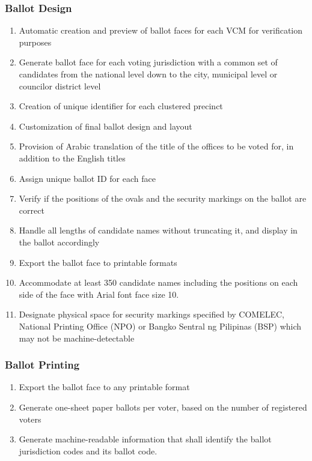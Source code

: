 \documentclass[a4paper, 11pt]{article}
\begin{document}
\subsubsection{Ballot Design}
\begin{enumerate}
	\item Automatic creation and preview of ballot faces for each VCM for verification purposes
	\item Generate ballot face for each voting jurisdiction with a common set of candidates from the national level down to the city, municipal level or councilor district level
	\item Creation of unique identifier for each clustered precinct
	\item Customization of final ballot design and layout
	\item Provision of Arabic translation of the title of the offices to be voted for, in addition to the English titles
	\item Assign unique ballot ID for each face
	\item Verify if the positions of the ovals and the security markings on the ballot are correct
	\item Handle all lengths of candidate names without truncating it, and display in the ballot accordingly
	\item Export the ballot face to printable formats
	\item Accommodate at least 350 candidate names including the positions on each side of the face with Arial font face size 10.
	\item Designate physical space for security markings specified by COMELEC, National Printing Office (NPO) or Bangko Sentral ng Pilipinas (BSP) which may not be machine-detectable
\end{enumerate}
\subsubsection{Ballot Printing}
\begin{enumerate}
	\item Export the ballot face to any printable format
	\item Generate one-sheet paper ballots per voter, based on the number of registered voters
	\item Generate machine-readable information that shall identify the ballot jurisdiction codes and its ballot code.
\end{enumerate}
\end{document}
